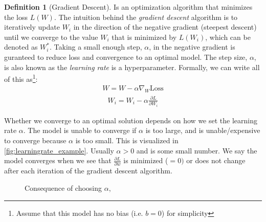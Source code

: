 \documentclass[11pt]{article}
\numberwithin{equation}{section}
\theoremstyle{definition}%
\newtheorem{definition}{Definition}[section]%
\begin{document}
\begin{definition}[Gradient Descent]
    Is an optimization algorithm that minimizes the loss $L(W)$. The intuition behind the \emph{gradient descent} algorithm is to iteratively update $W_i$ in the direction of the negative gradient (steepest descent) until we converge to the value $W_i$ that is minimized by $L(W_i)$, which can be denoted as $W_i^{\ast}$.  Taking a small enough step, $\alpha$, in the negative gradient is guranteed to reduce loss and convergence to an optimal model. The step size, $\alpha$, is also known as the \emph{learning rate} is a hyperparameter. Formally, we can write all of this as\footnote{Assume that this model has no bias (i.e. $b=0$) for simplicity}:
    \begin{align}
        W = W - \alpha \nabla_W \text{Loss}  
    \end{align}
    \begin{align}
        W_i = W_i - \alpha \frac{\partial L}{\partial W_i}  
    \end{align}
\end{definition}

Whether we converge to an optimal solution depends on how we set the learning rate $\alpha$. The model is unable to converge if $\alpha$ is too large, and is unable/expensive to converge because $\alpha$ is too small. This is visualized in \autoref{fig:learningrate_example}. Usually $\alpha > 0$ and is some small number. We say the model converges when we see that $\frac{\partial L}{\partial w}$ is minimized ($=0)$ or does not change after each iteration of the gradient descent algorithm.

\begin{figure}[h]%
    \centering
    \qquad
    \caption{Consequence of choosing $\alpha$, \cite{Cornell}}%
    \label{fig:learningrate_example}%
\end{figure}
\end{document}
